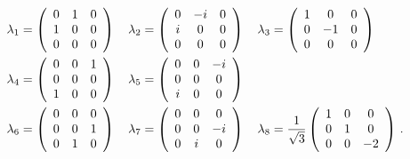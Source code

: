 \begin{align}
\lambda _ { 1 } &= \left( \begin{array} { c c c } { 0 } & { 1 } & { 0 } \\ { 1 } & { 0 } & { 0 } \\ { 0 } & { 0 } & { 0 } \end{array} \right) \quad \lambda _ { 2 } = \left( \begin{array} { c c c } { 0 } & { - i } & { 0 } \\ { i } & { 0 } & { 0 } \\ { 0 } & { 0 } & { 0 } \end{array} \right) \quad \lambda _ { 3 } = \left( \begin{array} { c c c } { 1 } & { 0 } & { 0 } \\ { 0 } & { - 1 } & { 0 } \\ { 0 } & { 0 } & { 0 } \end{array} \right)\nonumber\\
\lambda _ { 4 } &= \left( \begin{array} { c c c } { 0 } & { 0 } & { 1 } \\ { 0 } & { 0 } & { 0 } \\ { 1 } & { 0 } & { 0 } \end{array} \right) \quad \lambda _ { 5 } = \left( \begin{array} { c c c } { 0 } & { 0 } & { - i } \\ { 0 } & { 0 } & { 0 } \\ { i } & { 0 } & { 0 } \end{array} \right)\nonumber\\
\lambda _ { 6 } &= \left( \begin{array} { c c c } { 0 } & { 0 } & { 0 } \\ { 0 } & { 0 } & { 1 } \\ { 0 } & { 1 } & { 0 } \end{array} \right) \quad \lambda _ { 7 } = \left( \begin{array} { c c c } { 0 } & { 0 } & { 0 } \\ { 0 } & { 0 } & { - i } \\ { 0 } & { i } & { 0 } \end{array} \right) \quad \lambda _ { 8 } = \frac { 1 } { \sqrt { 3 } } \left( \begin{array} { c c c } { 1 } & { 0 } & { 0 } \\ { 0 } & { 1 } & { 0 } \\ { 0 } & { 0 } & { - 2 } \end{array} \right)\, .
\end{align}

